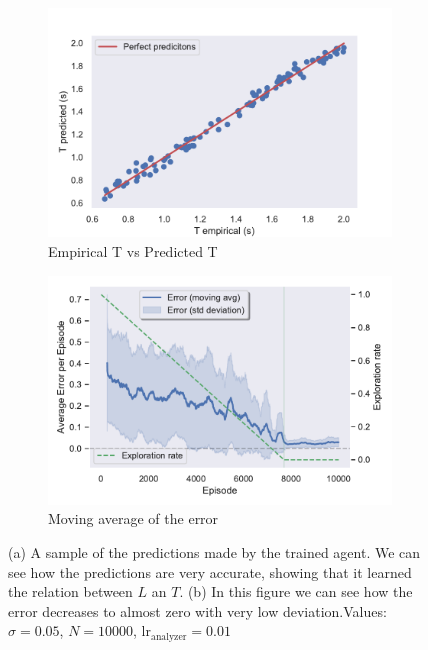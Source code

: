 \documentclass[11pt,a4paper,twoside]{report}
\newcommand{\+}{\textnormal{+} }
\theoremstyle{definition}
\numberwithin{equation}{chapter}
\begin{document}
  
\begin{figure}[t]
  \centering
  \begin{subfigure}{.5\textwidth}
    \centering
    \includegraphics[width=1\linewidth]{figures/Real-vs-Pred-Pendulum.pdf}
    \caption{Empirical T vs Predicted T}
    \label{fig:RealvsPredictedPendulum}
  \end{subfigure}%
  \begin{subfigure}{.5\textwidth}
    \centering
    \includegraphics[width=1\linewidth]{figures/Error-Pendulum.pdf}
    \caption{Moving average of the error}
    \label{fig:ErrorAveragePendulum}
  \end{subfigure}
  \caption{(a) A sample of the predictions made by the trained agent. We can see
  how the predictions are very accurate, showing that it learned the relation
  between $L$ an $T$. (b) In this figure we can see how the error decreases to
  almost zero with very low deviation.Values: $\sigma=0.05$, $N=10000$,
  $\text{lr}_\text{analyzer}=0.01$}
  \label{fig:PendulumError}
  \end{figure}
\end{document}
